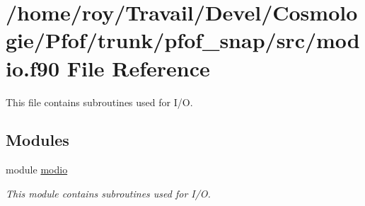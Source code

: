 \hypertarget{pfof__snap_2src_2modio_8f90}{}\section{/home/roy/\+Travail/\+Devel/\+Cosmologie/\+Pfof/trunk/pfof\+\_\+snap/src/modio.f90 File Reference}
\label{pfof__snap_2src_2modio_8f90}


This file contains subroutines used for I/O.  


\subsection*{Modules}
\begin{DoxyCompactItemize}
\item 
module \hyperlink{namespacemodio}{modio}
\begin{DoxyCompactList}\small\item\em This module contains subroutines used for I/O. \end{DoxyCompactList}\end{DoxyCompactItemize}

